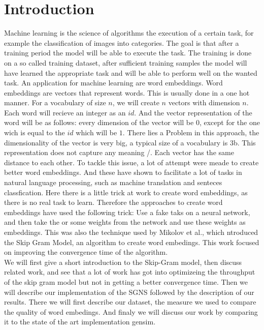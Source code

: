 \chapter{Introduction}\label{chap:introduction}



Machine learning is the science of algorithms the execution of a certain task, for example the classification of images into categories. The goal is that after a training period the model will be able to execute the task. The training is done on a so called training dataset, after sufficient training samples the model will have learned the appropriate task and will be able to perform well on the wanted task. An application for machine learning are word embeddings. Word embeddings are vectors that represent words. This is usually done in a one hot manner. For a vocabulary of size $n$, we will create $n$ vectors with dimension $n$. Each word will recieve an integer as an $id$. And the vector representation of the word will be as follows: every dimension of the vector will be $0$, except for the one wich is equal to the $id$ which will be $1$. There lies a Problem in this approach, the dimensionality of the vector is very big, a typical size of a vocabulary is 3b. This representation does not capture any meaning /. Each vector has the same distance to each other. To tackle this issue, a lot of attempt were meade to create better word embeddings. And these have shown to facilitate a lot of tasks in natural language processing, such as machine translation and senteces classfication. Here there is a little trick at work to create word embeddings, as there is no real task to learn. Therefore the approaches to create word embeddings have used the following trick: Use a fake taks on a neural network, and then take the or some weights from the network and use these weights as embeddings. This was also the technique used by Mikolov et al., which ntroduced the Skip Gram Model, an algorithm to create word embedings. 
This work focused on improving the convergence time of the algorithm. \\
We will first give a short introduction to the Skip-Gram model, then discuss related work, and see that a lot of work has got into optimizeing the throughput of the skip gram model but not in getting a better convergence time. Then we will describe our implementation of the SGNS followed by the description of our results. There we will first describe our dataset, the measure we used to compare the quality of word embedings. And finaly we will discuss our work by comparing it to the state of the art implementation gensim. 

  














